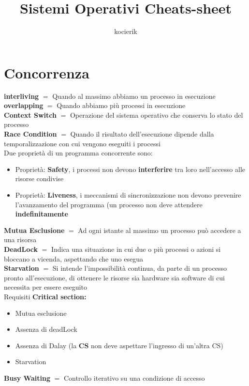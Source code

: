 \documentclass{article}
\title{Sistemi Operativi Cheats-sheet}
\author{kocierik}
\begin{document}
\maketitle

\section{Concorrenza}

\textbf{interliving} $=$ Quando al massimo abbiamo un processo in esecuzione\\
\textbf{overlapping} $=$ Quando abbiamo più processi in esecuzione\\
\textbf{Context Switch} $=$ Operazione del sistema operativo che conserva lo stato del processo \\
\textbf{Race Condition} $=$ Quando il risultato dell'esecuzione dipende dalla temporalizzazione con cui vengono eseguiti i processi\\
Due proprietà di un programma concorrente sono:
\begin{itemize}
  \item Proprietà: \textbf{Safety}, i processi non devono \textbf{interferire} tra loro nell'accesso alle risorse condivise
  \item Proprietà: \textbf{Liveness}, i meccanismi di sincronizzazione non devono prevenire l'avanzamento del programma (un processo non deve attendere \textbf{indefinitamente}

\end{itemize}
\textbf{Mutua Esclusione} $=$ Ad ogni istante al massimo un processo può accedere a una risorsa\\
\textbf{DeadLock} $=$ Indica una situazione in cui due o più processi o azioni si bloccano a vicenda, aspettando che uno esegua\\
\textbf{Starvation} $=$ Si intende l'impossibilità continua, da parte di un processo pronto all'esecuzione, di ottenere le risorse sia hardware sia software di cui necessita per essere eseguito\\
Requisiti \textbf{Critical section:}
\begin{itemize}
  \item Mutua esclusione
  \item Assenza di deadLock
  \item Assenza di Dalay (la \textbf{CS} non deve aspettare l'ingresso di un'altra CS)
  \item Starvation
\end{itemize}
\textbf{Busy Waiting} $=$ Controllo iterativo su una condizione di accesso\\
\end{document}
